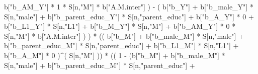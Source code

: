 \documentclass[
]{book}
\newenvironment{Shaded}{\begin{snugshade}}{\end{snugshade}}
\newcommand{\DecValTok}[1]{\textcolor[rgb]{0.00,0.00,0.81}{#1}}
\newcommand{\NormalTok}[1]{#1}
\newcommand{\SpecialCharTok}[1]{\textcolor[rgb]{0.00,0.00,0.00}{#1}}
\newcommand{\StringTok}[1]{\textcolor[rgb]{0.31,0.60,0.02}{#1}}
\begin{document}
\begin{Shaded}
\begin{Highlighting}[]
\NormalTok{                            b[}\StringTok{"b\_AM\_Y"}\NormalTok{] }\SpecialCharTok{*} \DecValTok{1} \SpecialCharTok{*}\NormalTok{ S[n,}\StringTok{"M"}\NormalTok{] }\SpecialCharTok{*}\NormalTok{ b[}\StringTok{"A.M.inter"}\NormalTok{] ) }\SpecialCharTok{{-}} 
\NormalTok{                          ( b[}\StringTok{"b\_Y"}\NormalTok{] }\SpecialCharTok{+} 
\NormalTok{                              b[}\StringTok{"b\_male\_Y"}\NormalTok{] }\SpecialCharTok{*}\NormalTok{ S[n,}\StringTok{"male"}\NormalTok{] }\SpecialCharTok{+} 
\NormalTok{                              b[}\StringTok{"b\_parent\_educ\_Y"}\NormalTok{] }\SpecialCharTok{*}\NormalTok{ S[n,}\StringTok{"parent\_educ"}\NormalTok{] }\SpecialCharTok{+} 
\NormalTok{                              b[}\StringTok{"b\_A\_Y"}\NormalTok{] }\SpecialCharTok{*} \DecValTok{0} \SpecialCharTok{+} 
\NormalTok{                              b[}\StringTok{"b\_L1\_Y"}\NormalTok{] }\SpecialCharTok{*}\NormalTok{ S[n,}\StringTok{"L1"}\NormalTok{] }\SpecialCharTok{+}
\NormalTok{                              b[}\StringTok{"b\_M\_Y"}\NormalTok{] }\SpecialCharTok{*}\NormalTok{ S[n,}\StringTok{"M"}\NormalTok{] }\SpecialCharTok{+} 
\NormalTok{                              b[}\StringTok{"b\_AM\_Y"}\NormalTok{] }\SpecialCharTok{*} \DecValTok{0} \SpecialCharTok{*}\NormalTok{ S[n,}\StringTok{"M"}\NormalTok{] }\SpecialCharTok{*}\NormalTok{ b[}\StringTok{"A.M.inter"}\NormalTok{] ) ) }\SpecialCharTok{*}
\NormalTok{    (( b[}\StringTok{"b\_M"}\NormalTok{] }\SpecialCharTok{+} 
\NormalTok{         b[}\StringTok{"b\_male\_M"}\NormalTok{] }\SpecialCharTok{*}\NormalTok{ S[n,}\StringTok{"male"}\NormalTok{] }\SpecialCharTok{+} 
\NormalTok{         b[}\StringTok{"b\_parent\_educ\_M"}\NormalTok{] }\SpecialCharTok{*}\NormalTok{ S[n,}\StringTok{"parent\_educ"}\NormalTok{] }\SpecialCharTok{+} 
\NormalTok{         b[}\StringTok{"b\_L1\_M"}\NormalTok{] }\SpecialCharTok{*}\NormalTok{ S[n,}\StringTok{"L1"}\NormalTok{] }\SpecialCharTok{+}
\NormalTok{         b[}\StringTok{"b\_A\_M"}\NormalTok{] }\SpecialCharTok{*} \DecValTok{0}\NormalTok{ )}\SpecialCharTok{\^{}}\NormalTok{( S[n,}\StringTok{"M"}\NormalTok{] )) }\SpecialCharTok{*} 
\NormalTok{    (( }\DecValTok{1} \SpecialCharTok{{-}}\NormalTok{ (b[}\StringTok{"b\_M"}\NormalTok{] }\SpecialCharTok{+} 
\NormalTok{              b[}\StringTok{"b\_male\_M"}\NormalTok{] }\SpecialCharTok{*}\NormalTok{ S[n,}\StringTok{"male"}\NormalTok{] }\SpecialCharTok{+} 
\NormalTok{              b[}\StringTok{"b\_parent\_educ\_M"}\NormalTok{] }\SpecialCharTok{*}\NormalTok{ S[n,}\StringTok{"parent\_educ"}\NormalTok{] }\SpecialCharTok{+} 

\end{Highlighting}
\end{Shaded}
\end{document}
